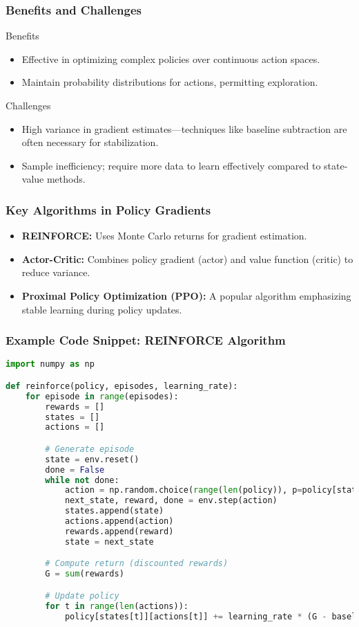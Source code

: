 \documentclass[aspectratio=169]{beamer}
\begin{document}
\begin{frame}
    \frametitle{Benefits and Challenges}
    \begin{block}{Benefits}
        \begin{itemize}
            \item Effective in optimizing complex policies over continuous action spaces.
            \item Maintain probability distributions for actions, permitting exploration.
        \end{itemize}
    \end{block}

    \begin{block}{Challenges}
        \begin{itemize}
            \item High variance in gradient estimates—techniques like baseline subtraction are often necessary for stabilization.
            \item Sample inefficiency; require more data to learn effectively compared to state-value methods.
        \end{itemize}
    \end{block}
\end{frame}

\begin{frame}
    \frametitle{Key Algorithms in Policy Gradients}
    \begin{itemize}
        \item \textbf{REINFORCE:} Uses Monte Carlo returns for gradient estimation.
        \item \textbf{Actor-Critic:} Combines policy gradient (actor) and value function (critic) to reduce variance.
        \item \textbf{Proximal Policy Optimization (PPO):} A popular algorithm emphasizing stable learning during policy updates.
    \end{itemize}
\end{frame}

\begin{frame}[fragile]
    \frametitle{Example Code Snippet: REINFORCE Algorithm}
    \begin{lstlisting}[language=Python]
import numpy as np

def reinforce(policy, episodes, learning_rate):
    for episode in range(episodes):
        rewards = []
        states = []
        actions = []

        # Generate episode
        state = env.reset()
        done = False
        while not done:
            action = np.random.choice(range(len(policy)), p=policy[state])
            next_state, reward, done = env.step(action)
            states.append(state)
            actions.append(action)
            rewards.append(reward)
            state = next_state

        # Compute return (discounted rewards)
        G = sum(rewards)

        # Update policy
        for t in range(len(actions)):
            policy[states[t]][actions[t]] += learning_rate * (G - baseline) 
    \end{lstlisting}
\end{frame}
\end{document}

